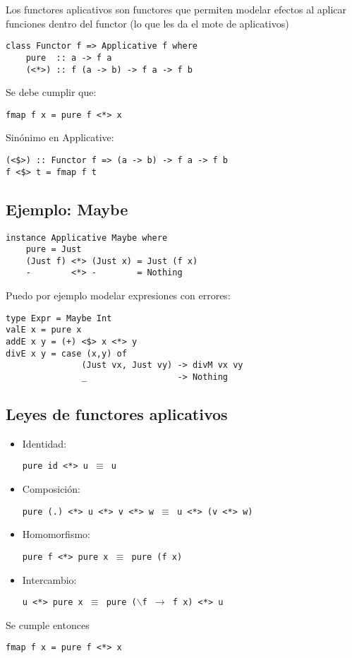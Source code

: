 \documentclass{article}
\newcommand{\imp}[1]{\textcolor{color1}{#1}}
\begin{document}
\noindent Los \imp{functores aplicativos} son functores que permiten modelar efectos al aplicar funciones dentro del functor (lo que les da el mote de aplicativos)

\begin{lstlisting}
class Functor f => Applicative f where
    pure  :: a -> f a
    (<*>) :: f (a -> b) -> f a -> f b
\end{lstlisting}

Se debe cumplir que:

\begin{lstlisting}
fmap f x = pure f <*> x
\end{lstlisting}

Sinónimo en \imp{Applicative}:

\begin{lstlisting}
(<$>) :: Functor f => (a -> b) -> f a -> f b
f <$> t = fmap f t
\end{lstlisting}

\subsection{Ejemplo: Maybe}

\begin{lstlisting}
instance Applicative Maybe where
    pure = Just
    (Just f) <*> (Just x) = Just (f x)
    -        <*> -        = Nothing
\end{lstlisting}

Puedo por ejemplo modelar expresiones con errores:

\begin{lstlisting}
type Expr = Maybe Int
valE x = pure x
addE x y = (+) <$> x <*> y
divE x y = case (x,y) of
               (Just vx, Just vy) -> divM vx vy
               _                  -> Nothing
\end{lstlisting}

\subsection{Leyes de functores aplicativos}

\begin{itemize}
\item Identidad:
\begin{center}
\texttt{pure id <*>~u $\equiv$ u}
\end{center}
\item Composición:
\begin{center}
\texttt{pure (.) <*>~u <*>~v <*>~w $\equiv$ u <*>~(v <*>~w)}
\end{center}
\item Homomorfismo:
\begin{center}
\texttt{pure f <*>~pure x $\equiv$ pure (f x)}
\end{center}
\item Intercambio:
\begin{center}
\texttt{u <*>~pure x $\equiv$ pure ($\backslash$f $\rightarrow$ f x) <*>~u}
\end{center}
\end{itemize}
Se cumple entonces
\begin{center}
\texttt{fmap~f~x = pure~f <*>~x}
\end{center}
\end{document}
